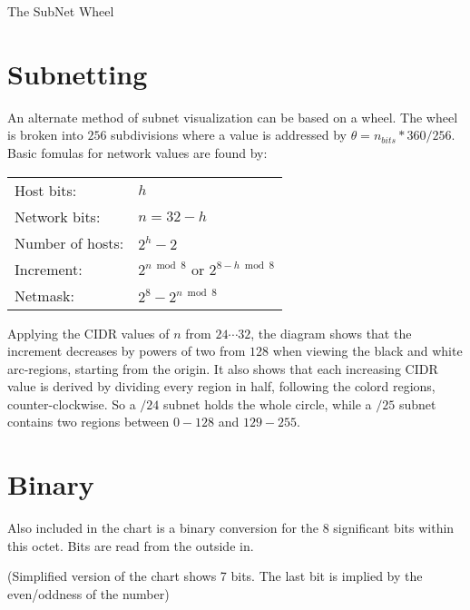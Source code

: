 \documentclass[10pt]{article}
\begin{document}
\thispagestyle{empty}
\begin{center}
  {\Large The SubNet Wheel}\\
\end{center}

\section{Subnetting}

An alternate method of subnet visualization can be based on a wheel. The wheel
is broken into $256$ subdivisions where a value is addressed by
$\theta=n_{bits}*360/256$. Basic fomulas for network values are found by:

\begin{tabular}{ll}
Host bits:   	& $h$\\
Network bits: 		& $n=32-h$\\
Number of hosts: 	& $2^h-2$\\
Increment: 		& $2^{n \bmod 8}$ or $2^{8-h \bmod 8}$\\
Netmask: 		& $2^8-2^{n \bmod 8}$\\
\end{tabular}

Applying the CIDR values of $n$ from $24\cdots32$, the diagram shows that the
increment decreases by powers of two from $128$ when viewing the black and white
arc-regions, starting from the origin. It also shows that each increasing CIDR
value is derived by dividing every region in half, following the colord regions,
counter-clockwise. So a $/24$ subnet holds the whole circle, while a $/25$
subnet contains two regions between $0-128$ and $129-255$.

\section{Binary}

Also included in the chart is a binary conversion for the 8 significant bits
within this octet. Bits are read from the outside in.

(Simplified version of the chart shows 7 bits. The last bit is implied by the
even/oddness of the number)
\end{document}
